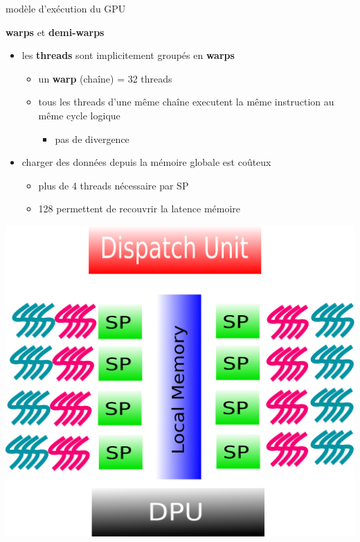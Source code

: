 \documentclass[11pt,mathserif]{beamer}
\begin{document}
\begin{frame}{modèle d'exécution du GPU}
  \begin{flushright}
    {\bf warps } et {\bf demi-warps}
  \end{flushright}
\begin{minipage}[c]{0.49\linewidth}
\begin{itemize}
  \item les {\bf threads} sont implicitement groupés en {\bf warps}
    \begin{itemize}
      \item un {\bf warp} (chaîne) = 32 threads 
      \item tous les threads d'une même chaîne executent la même instruction au même cycle logique
        \begin{itemize}
          \item pas de divergence
        \end{itemize}
    \end{itemize}
  \item charger des données depuis la mémoire globale est coûteux
    \begin{itemize}
      \item plus de 4 threads nécessaire par SP
      \item 128 permettent de recouvrir la latence mémoire
    \end{itemize}
\end{itemize}
\end{minipage}
\begin{minipage}[c]{0.49\linewidth}
\begin{center}
  \includegraphics[width=0.9\linewidth]{fig/GPUArchi8ThreadDiv.eps}
\end{center}
\end{minipage}
\end{frame}
\end{document}
